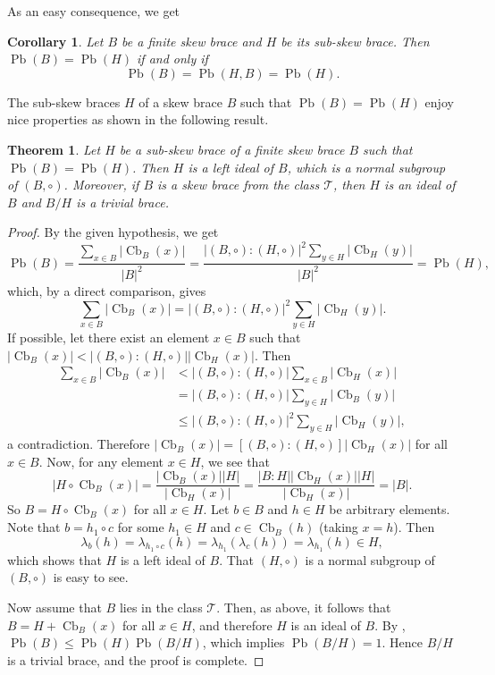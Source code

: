 \documentclass[10pt,a4paper]{amsart}
\numberwithin{equation}{section}
\newtheorem{cor}[equation]{Corollary}
\newtheorem{thm}[equation]{Theorem}
\newcommand{\Cb}{\operatorname{Cb} }
\newcommand{\Pb}{\operatorname{Pb} }
\begin{document}
As an easy consequence, we get
\begin{cor}
    Let $B$ be a finite skew brace and $H$ be its sub-skew brace. Then $\Pb(B)=\Pb(H)$ if and only if
    $$\Pb(B)=\Pb(H,B)=\Pb(H).$$
\end{cor}



The sub-skew braces $H$ of a skew brace $B$ such that $\Pb(B)=\Pb(H)$ enjoy nice properties as shown in the following result.

\begin{thm} %
    Let $H$ be a sub-skew brace of a finite skew brace $B$ such that $\Pb(B)=\Pb(H)$. Then $H$ is a left ideal of $B$, which is a normal subgroup of $(B,\circ)$. Moreover, if $B$ is a skew brace from the class $\mathcal{T}$, then  $H$ is an ideal of $B$ and $B/H$ is a trivial brace.
\end{thm}
\begin{proof}   
       By the given hypothesis, we get
       $$ \Pb(B)=\frac{\sum_{x\in B}|\Cb_B(x)|}{|B|^2}= \frac{{|(B,\circ):(H,\circ)|}^2\sum_{y\in H}|\Cb_H(y)|}{|B|^2}=\Pb(H), $$
       which, by a direct comparison, gives
       $$\sum_{x\in B}|\Cb_B(x)|={|(B,\circ):(H,\circ)|}^2\sum_{y\in H}|\Cb_H(y)|.$$
       If possible, let there exist an element $x\in B$ such that $|\Cb_B(x)|<|(B,\circ):(H,\circ)||\Cb_H(x)|$. Then 
       \begin{align*}
           \sum_{x\in B}|\Cb_B(x)|&<{|(B,\circ):(H,\circ)|}\sum_{x\in B}|\Cb_H(x)|\\
                                  &={|(B,\circ):(H,\circ)|}\sum_{y\in H}|\Cb_B(y)|\\
                                  &\leqslant{|(B,\circ):(H,\circ)|}^2\sum_{y\in H}|\Cb_H(y)|,
       \end{align*}
       a contradiction. Therefore  $|\Cb_B(x)|=[(B,\circ):(H,\circ)]|\Cb_H(x)|$ for all $x\in B$. Now, for any element $x\in H$, we see that
           $$
              | H\circ \Cb_B(x) |=\frac{|\Cb_B(x)||H|}{|\Cb_H(x)|}=\frac{|B:H||\Cb_H(x)||H|}{|\Cb_H(x)|}=|B|.
           $$
           So $B=H\circ \Cb_B(x)$ for all $x\in H$. Let $b\in B$ and $h\in H$ be arbitrary elements. Note that $b=h_1\circ c$ for some $h_1\in H$ and $c\in \Cb_ B(h)$ (taking $x = h$). Then 
           $$\lambda_{b}(h)=\lambda_ {h_ 1\circ c}(h)=\lambda_{h_1}(\lambda_c(h))=\lambda_ {h_ 1}(h) \in H,$$
           which shows that $H$ is a left ideal of $B$. That $(H, \circ)$ is a normal subgroup of $(B,\circ)$ is easy to see.

        Now assume that $B$ lies in the class $\mathcal T$.
           Then, as above, it follows that  $B = H + \Cb_B(x)$ for all $x \in H$, and therefore  $H$ is an ideal of $B$. By \cite{MY26}, $\Pb(B)\leqslant \Pb(H)\Pb(B/H)$, which implies  $\Pb(B/H)=1$. Hence $B/H$ is a trivial brace, and the proof is complete.           
\end{proof}
\end{document}
